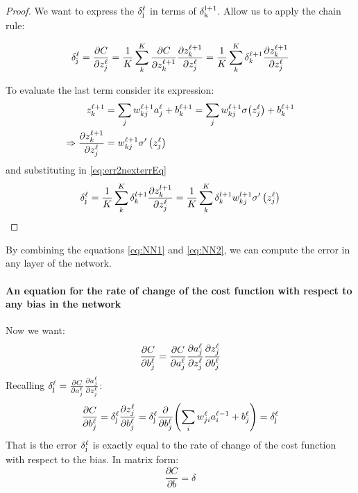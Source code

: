 \begin{proof}
We want to express the $\mathrm{\delta^\ell_j}$ in terms of $\mathrm{\delta_k^{l+1}}$. Allow us to apply the chain rule:

\begin{equation}
\mathrm{\delta^\ell_j} = \frac{\partial C}{\partial z_j^\ell} = \frac{1}{K}\sum_k^K \frac{\partial C}{\partial z_k^{\ell+1}} \frac{\partial z_k^{\ell+1}}{\partial z_j^\ell}  = \frac{1}{K}\sum_k^K \delta_k^{\ell+1} \frac{\partial z_k^{\ell+1}}{\partial z_j^\ell} 
\label{eq:err2nexterrEq}
\end{equation}

To evaluate the last term consider its expression:
\begin{equation}
\begin{aligned}
z_k^{\ell+1} &= \sum_j w_{kj}^{\ell+1}a_j^\ell + b_k^{\ell+1} = \sum_j w_{kj}^{\ell+1}\sigma\br{z_j^\ell} + b_k^{\ell+1}\\
\Rightarrow \frac{\partial z_k^{\ell+1}}{\partial  z_j^{\ell}} &= w_{kj}^{\ell+1} \sigma'\left( z_j^\ell\right)
\end{aligned}
\end{equation}
and substituting in \autoref{eq:err2nexterrEq}
\begin{equation}
\mathrm{\delta^\ell_j} = \frac{1}{K}\sum_k^K \delta_k^{l+1} \frac{\partial z_k^{l+1}}{\partial z_j^\ell}  = \frac{1}{K}\sum_k^K \delta_k^{l+1} w_{kj}^{l+1} \sigma'\left( z_j^\ell\right)
\label{eq:NN2}
\end{equation}
\end{proof}

By combining the equations \autoref{eq:NN1} and \autoref{eq:NN2}, we can compute the error in any layer of the network.

\paragraph{An equation for the rate of change of the cost function with respect to any bias in the network}
Now we want:
\begin{equation}
\frac{\mathrm{\partial} C}{\mathrm{\partial} b_j^\ell} = \frac{\mathrm{\partial} C}{\mathrm{\partial} a_j^\ell} \frac{\mathrm{\partial} a_j^\ell}{\mathrm{\partial} z_j^\ell} \frac{\mathrm{\partial} z_j^\ell}{\mathrm{\partial} b_j^\ell} 
\end{equation}
Recalling $\mathrm{\delta^\ell_j}= \frac{\mathrm{\partial} C}{\mathrm{\partial} a_j^\ell} \frac{\mathrm{\partial} a_j^\ell}{\mathrm{\partial} z_j^\ell}$:
\begin{equation}
\frac{\pr C}{\pr b_j^\ell} = \derlj \frac{\pr z_j^\ell}{\pr b_j^\ell} =  \derlj \frac{\pr }{\pr b_j^\ell} \br{\sum_i w_{ji}^\ell a_i^{\ell-1}+b_j^\ell} =  \derlj 
\end{equation}
That is the error $\mathrm{\delta^\ell_j}$ is exactly equal to the rate of change of the cost function with respect to the bias. In matrix form:
\begin{equation}
\frac{\partial C}{\partial b} = \delta
\end{equation}

